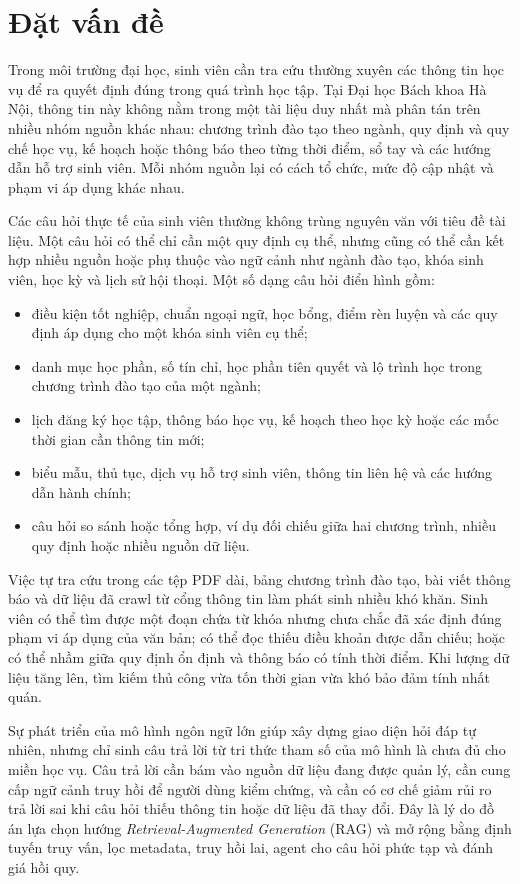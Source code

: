 \documentclass[../DoAn.tex]{subfiles}
\begin{document}
\section{Đặt vấn đề}
\label{sec:dvd}

Trong môi trường đại học, sinh viên cần tra cứu thường xuyên các thông tin học
vụ để ra quyết định đúng trong quá trình học tập. Tại Đại học Bách khoa Hà Nội,
thông tin này không nằm trong một tài liệu duy nhất mà phân tán trên nhiều nhóm
nguồn khác nhau: chương trình đào tạo theo ngành, quy định và quy chế học vụ,
kế hoạch hoặc thông báo theo từng thời điểm, sổ tay và các hướng dẫn hỗ trợ sinh
viên. Mỗi nhóm nguồn lại có cách tổ chức, mức độ cập nhật và phạm vi áp dụng
khác nhau.

Các câu hỏi thực tế của sinh viên thường không trùng nguyên văn với tiêu đề tài
liệu. Một câu hỏi có thể chỉ cần một quy định cụ thể, nhưng cũng có thể cần kết
hợp nhiều nguồn hoặc phụ thuộc vào ngữ cảnh như ngành đào tạo, khóa sinh viên,
học kỳ và lịch sử hội thoại. Một số dạng câu hỏi điển hình gồm:

\begin{itemize}
    \item điều kiện tốt nghiệp, chuẩn ngoại ngữ, học bổng, điểm rèn luyện và các
    quy định áp dụng cho một khóa sinh viên cụ thể;
    \item danh mục học phần, số tín chỉ, học phần tiên quyết và lộ trình học
    trong chương trình đào tạo của một ngành;
    \item lịch đăng ký học tập, thông báo học vụ, kế hoạch theo học kỳ hoặc các
    mốc thời gian cần thông tin mới;
    \item biểu mẫu, thủ tục, dịch vụ hỗ trợ sinh viên, thông tin liên hệ và các
    hướng dẫn hành chính;
    \item câu hỏi so sánh hoặc tổng hợp, ví dụ đối chiếu giữa hai chương trình,
    nhiều quy định hoặc nhiều nguồn dữ liệu.
\end{itemize}

Việc tự tra cứu trong các tệp PDF dài, bảng chương trình đào tạo, bài viết thông
báo và dữ liệu đã crawl từ cổng thông tin làm phát sinh nhiều khó khăn. Sinh viên
có thể tìm được một đoạn chứa từ khóa nhưng chưa chắc đã xác định đúng phạm vi
áp dụng của văn bản; có thể đọc thiếu điều khoản được dẫn chiếu; hoặc có thể
nhầm giữa quy định ổn định và thông báo có tính thời điểm. Khi lượng dữ liệu
tăng lên, tìm kiếm thủ công vừa tốn thời gian vừa khó bảo đảm tính nhất quán.

Sự phát triển của mô hình ngôn ngữ lớn giúp xây dựng giao diện hỏi đáp tự nhiên,
nhưng chỉ sinh câu trả lời từ tri thức tham số của mô hình là chưa đủ cho miền
học vụ. Câu trả lời cần bám vào nguồn dữ liệu đang được quản lý, cần cung cấp
ngữ cảnh truy hồi để người dùng kiểm chứng, và cần có cơ chế giảm rủi ro trả lời
sai khi câu hỏi thiếu thông tin hoặc dữ liệu đã thay đổi. Đây là lý do đồ án lựa
chọn hướng \textit{Retrieval-Augmented Generation} (RAG) và mở rộng bằng định
tuyến truy vấn, lọc metadata, truy hồi lai, agent cho câu hỏi phức tạp và đánh
giá hồi quy.
\end{document}
